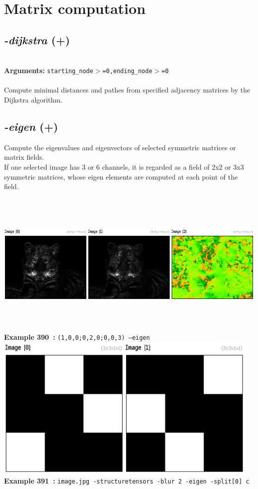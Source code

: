 \documentclass[a4paper,11pt,twoside]{book}
\begin{document}
\section{Matrix computation}


\subsection{\emph{-dijkstra} (+)}\vspace*{-0.5em}
~\\\textbf{Arguments: } 
{\small \texttt{starting\_node$>$=0,ending\_node$>$=0}}\\~\\
Compute minimal distances and pathes from specified adjacency matrices by the Dijkstra algorithm.


\subsection{\emph{-eigen} (+)}\vspace*{-0.5em}
Compute the eigenvalues and eigenvectors of selected symmetric matrices or matrix fields.
~\\If one selected image has 3 or 6 channels, it is regarded as a field of 2x2 or 3x3 symmetric matrices,
whose eigen elements are computed at each point of the field.
\begin{center}\includegraphics[keepaspectratio=true,height=7cm,width=\textwidth]{img/gmic_def390.jpg}\\
{\footnotesize \textbf{Example 390~:} \texttt{(1,0,0;0,2,0;0,0,3) --eigen}}
\\\includegraphics[keepaspectratio=true,height=7cm,width=\textwidth]{img/gmic_def391.jpg}\\
{\footnotesize \textbf{Example 391~:} \texttt{image.jpg -structuretensors -blur 2 -eigen -split[0] c}}
\end{center}
\end{document}

